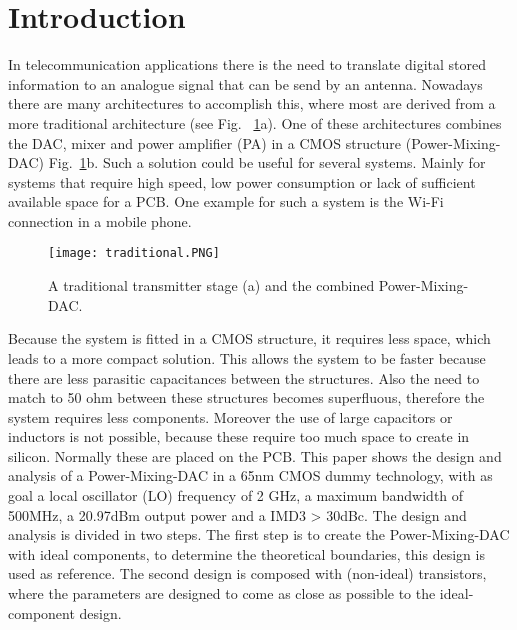 \section{Introduction} \label{sec:introduction}
In telecommunication applications there is the need to translate digital stored information to an analogue signal that can be send by an antenna. Nowadays there are many architectures to accomplish this, where most are derived from a more traditional architecture (see Fig. ~\ref{fig:traditional}a). One of these architectures combines the DAC, mixer and power amplifier (PA) in a CMOS structure (Power-Mixing-DAC) Fig.~\ref{fig:traditional}b. Such a solution could be useful for several systems. Mainly for systems that require high speed, low power consumption or lack of sufficient available space for a PCB. One example for such a system is the Wi-Fi connection in a mobile phone.
\begin{figure}[h]
\texttt{[image: traditional.PNG]}
\caption{A traditional transmitter stage (a) and the combined Power-Mixing-DAC. ~\cite{powerdac}}
\label{fig:traditional}
\end{figure} 
Because the system is fitted in a CMOS structure, it requires less space, which leads to a more compact solution. This allows the system to be faster because there are less parasitic capacitances between the structures. Also the need to match to 50 ohm between these structures becomes superfluous, therefore the system requires less components. Moreover the use of large capacitors or inductors is not possible, because these require too much space to create in silicon. Normally these are placed on the PCB.
This paper shows the design and analysis of a Power-Mixing-DAC in a 65nm CMOS dummy technology, with as goal a local oscillator (LO) frequency of 2 GHz, a maximum bandwidth of 500MHz, a 20.97dBm output power and a IMD3 > 30dBc. The design and analysis is divided in two steps. The first step is to create the Power-Mixing-DAC with ideal components, to determine the theoretical boundaries, this design is used as reference. The second design is composed with (non-ideal) transistors, where the parameters are designed to come as close as possible to the ideal-component design.
